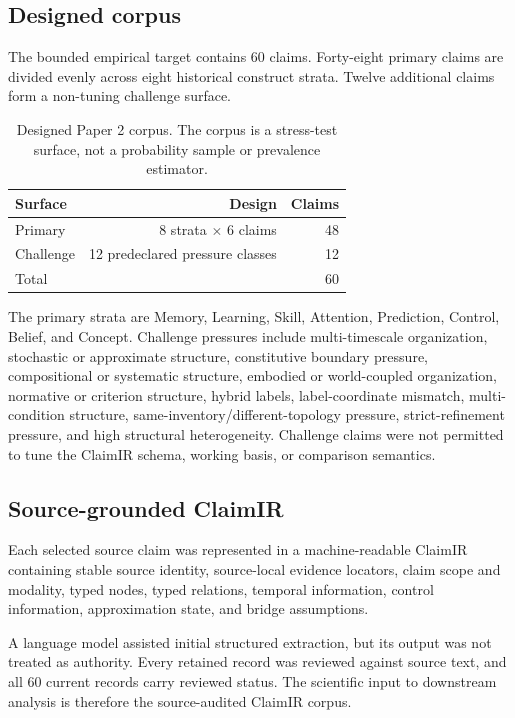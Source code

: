 \documentclass[11pt]{article}
\begin{document}
\subsection{Designed corpus}

The bounded empirical target contains 60 claims. Forty-eight primary claims are divided evenly across eight historical construct strata. Twelve additional claims form a non-tuning challenge surface.

\begin{table}[htbp]
\centering
\caption{Designed Paper 2 corpus. The corpus is a stress-test surface, not a probability sample or prevalence estimator.}
\label{tab:corpus}
\begin{tabular}{lrr}
\toprule
Surface & Design & Claims \\
\midrule
Primary & 8 strata \(\times\) 6 claims & 48 \\
Challenge & 12 predeclared pressure classes & 12 \\
\midrule
Total & & 60 \\
\bottomrule
\end{tabular}
\end{table}

The primary strata are Memory, Learning, Skill, Attention, Prediction, Control, Belief, and Concept. Challenge pressures include multi-timescale organization, stochastic or approximate structure, constitutive boundary pressure, compositional or systematic structure, embodied or world-coupled organization, normative or criterion structure, hybrid labels, label-coordinate mismatch, multi-condition structure, same-inventory/different-topology pressure, strict-refinement pressure, and high structural heterogeneity. Challenge claims were not permitted to tune the ClaimIR schema, working basis, or comparison semantics.

\subsection{Source-grounded ClaimIR}

Each selected source claim was represented in a machine-readable ClaimIR containing stable source identity, source-local evidence locators, claim scope and modality, typed nodes, typed relations, temporal information, control information, approximation state, and bridge assumptions.

A language model assisted initial structured extraction, but its output was not treated as authority. Every retained record was reviewed against source text, and all 60 current records carry reviewed status. The scientific input to downstream analysis is therefore the source-audited ClaimIR corpus.
\end{document}
